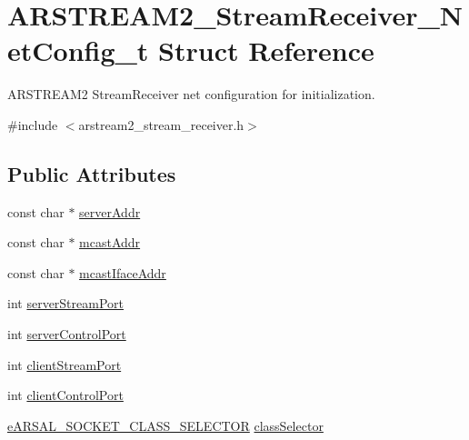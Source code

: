 \hypertarget{struct_a_r_s_t_r_e_a_m2___stream_receiver___net_config__t}{}\section{A\+R\+S\+T\+R\+E\+A\+M2\+\_\+\+Stream\+Receiver\+\_\+\+Net\+Config\+\_\+t Struct Reference}
\label{struct_a_r_s_t_r_e_a_m2___stream_receiver___net_config__t}


A\+R\+S\+T\+R\+E\+A\+M2 Stream\+Receiver net configuration for initialization.  




{\ttfamily \#include $<$arstream2\+\_\+stream\+\_\+receiver.\+h$>$}

\subsection*{Public Attributes}
\begin{DoxyCompactItemize}
\item 
const char $\ast$ \hyperlink{struct_a_r_s_t_r_e_a_m2___stream_receiver___net_config__t_ab60053709c2af390bc2031d8176ff709}{server\+Addr}
\item 
const char $\ast$ \hyperlink{struct_a_r_s_t_r_e_a_m2___stream_receiver___net_config__t_ada6cc0fd0eae00ec6e656a633b6a5f3b}{mcast\+Addr}
\item 
const char $\ast$ \hyperlink{struct_a_r_s_t_r_e_a_m2___stream_receiver___net_config__t_a8687e007cc838c3c5174a23f8c4f0d30}{mcast\+Iface\+Addr}
\item 
int \hyperlink{struct_a_r_s_t_r_e_a_m2___stream_receiver___net_config__t_a209ff0815b72c583d3a5f2cac2c7e14f}{server\+Stream\+Port}
\item 
int \hyperlink{struct_a_r_s_t_r_e_a_m2___stream_receiver___net_config__t_ad679e66ae443af8114bc24ff944fe9d2}{server\+Control\+Port}
\item 
int \hyperlink{struct_a_r_s_t_r_e_a_m2___stream_receiver___net_config__t_aa80f021570616dabae9af5b8decf5899}{client\+Stream\+Port}
\item 
int \hyperlink{struct_a_r_s_t_r_e_a_m2___stream_receiver___net_config__t_acf87ed740df6615c395e82dbb0e543ca}{client\+Control\+Port}
\item 
\hyperlink{_a_r_s_a_l___socket_8h_a384a22e08e042073bccebf450786749b}{e\+A\+R\+S\+A\+L\+\_\+\+S\+O\+C\+K\+E\+T\+\_\+\+C\+L\+A\+S\+S\+\_\+\+S\+E\+L\+E\+C\+T\+OR} \hyperlink{struct_a_r_s_t_r_e_a_m2___stream_receiver___net_config__t_af6c58cadcebd20c8290491b00fe5b385}{class\+Selector}
\end{DoxyCompactItemize}


